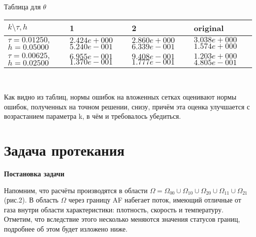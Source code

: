 \documentclass[a4paper]{article}
\theoremstyle{definition}
\numberwithin{equation}{section}
\begin{document}
\begin{center}
Таблица для $\theta$
\begin{tabular}{|p{1.1in}|p{1.2in}|p{1.2in}|p{1.2in}|} \hline
$k\setminus \tau, h $ & 1 & 2 & original \\ \hline

$\tau=0.01250 ,$ $h=0.05000$ &$2.424e+000$ $5.240e-001$ &$2.860e+000$ $6.339e-001$ &$3.038e+000$ $1.574e+000$  \\ \hline
$\tau=0.00625 ,$ $h=0.02500$ &$6.955e-001$ $1.370e-001$ &$9.408e-001$ $1.777e-001$ &$1.203e+000$ $4.805e-001$  \\ \hline
\end{tabular}\\[20pt]
\end{center}

Как видно из таблиц, нормы ошибок на вложенных сетках оценивают нормы ошибок, полученных на точном решении, снизу, причём эта оценка улучшается с возрастанием параметра k, в чём и требовалось убедиться.
\newpage
\section{Задача протекания}
\textbf{Постановка задачи}

Напомним, что расчёты производятся в области $\Omega = \Omega_{00}\cup \Omega_{10}\cup \Omega_{20}\cup \Omega_{11}\cup \Omega_{21}$ (рис.2). В область $\Omega$ через границу AF набегает поток, имеющий отличные от газа внутри области характеристики: плотность, скорость и температуру. Отметим, что вследствие этого несколько меняются значения статусов границ, подробнее об этом будет изложено ниже.
\end{document}
